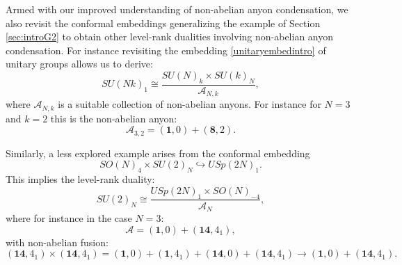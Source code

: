 \documentclass[11pt]{article}
\numberwithin{equation}{section}
\begin{document}
Armed with our improved understanding of non-abelian anyon condensation, we also revisit the conformal embeddings generalizing the example of Section \ref{sec:introG2} to obtain other level-rank dualities involving non-abelian anyon condensation.  For instance revisiting the embedding \eqref{unitaryembedintro} of unitary groups allows us to derive:
\begin{equation}
    SU(Nk)_{1} \cong \frac{SU(N)_{k} \times SU(k)_{N}}{\mathcal{A}_{N,k}},
\end{equation}
where $\mathcal{A}_{N,k}$ is a suitable collection of non-abelian anyons.  For instance for $N=3$ and $k=2$ this is the non-abelian anyon:
\begin{equation}
    \mathcal{A}_{3,2}=(\mathbf{1},0)+ (\mathbf{8},2).
\end{equation}

Similarly, a less explored example arises from the conformal embedding
\begin{equation} \label{additionalembeddingintro}
    SO(N)_{4} \times SU(2)_{N} \hookrightarrow USp(2N)_{1}.
\end{equation}
This implies the level-rank duality:
\begin{equation}
    SU(2)_{N} \cong \frac{USp(2N)_{1} \times SO(N)_{-4}}{\mathcal{A}_{N}},
\end{equation}
where for instance in the case $N=3$:
\begin{equation}
    \mathcal{A} = (\mathbf{1}, 0) + (\mathbf{14},4_{1}), 
\end{equation}
with non-abelian fusion:
\begin{equation}
    (\mathbf{14},4_{1}) \times (\mathbf{14},4_{1}) = (\mathbf{1},0) + (\mathbf{1},4_{1}) + (\mathbf{14}, 0) + (\mathbf{14},4_{1})\rightarrow (\mathbf{1},0) + (\mathbf{14},4_{1}).
\end{equation}

\setcounter{footnote}{0}
\end{document}
